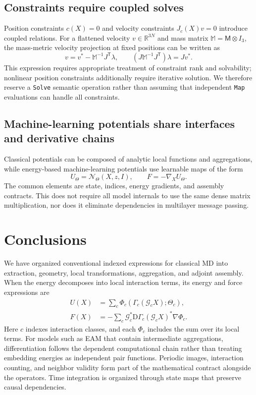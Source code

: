 \documentclass[11pt,a4paper]{article}
\newcommand{\RR}{\mathbb R}
\newcommand{\mass}{\mathsf M}
\theoremstyle{definition}
\begin{document}
\subsection{Constraints require coupled solves}
Position constraints $c(X)=0$ and velocity constraints $J_c(X)v=0$ introduce coupled relations.
For a flattened velocity $v\in\RR^{3N}$ and mass matrix $\mathbb M=\mass\otimes I_3$, the
mass-metric velocity projection at fixed positions can be written as
\begin{equation}
v=v^*-\mathbb M^{-1}J^{\mathsf T}\lambda,\qquad
(J\mathbb M^{-1}J^{\mathsf T})\lambda=Jv^*.
\end{equation}
This expression requires appropriate treatment of constraint rank and solvability; nonlinear
position constraints additionally require iterative solution. We therefore reserve a
\texttt{Solve} semantic operation rather than assuming that independent \texttt{Map} evaluations
can handle all constraints.

\subsection{Machine-learning potentials share interfaces and derivative chains}
Classical potentials can be composed of analytic local functions and aggregations, while
energy-based machine-learning potentials use learnable maps of the form
\begin{equation}
U_\Theta=\mathcal N_\Theta(X,z,I),\qquad F=-\nabla_XU_\Theta.
\end{equation}
The common elements are state, indices, energy gradients, and assembly contracts. This does not
require all model internals to use the same dense matrix multiplication, nor does it eliminate
dependencies in multilayer message passing.

\section{Conclusions}
We have organized conventional indexed expressions for classical MD into extraction, geometry,
local transformations, aggregation, and adjoint assembly. When the energy decomposes into local
interaction terms, its energy and force expressions are
\begin{align}
 U(X)&=\sum_c\Phi_c\!\left(\Gamma_c(\mathcal G_cX);\Theta_c\right),\label{eq:master-energy}\\
 F(X)&=-\sum_c\mathcal G_c^*\mathrm D\Gamma_c(\mathcal G_cX)^*\nabla\Phi_c.
 \label{eq:master-force}
\end{align}
Here $c$ indexes interaction classes, and each $\Phi_c$ includes the sum over its local terms.
For models such as EAM that contain intermediate aggregations, differentiation follows the
dependent computational chain rather than treating embedding energies as independent pair
functions. Periodic images, interaction counting, and neighbor validity form part of the
mathematical contract alongside the operators. Time integration is organized through state maps
that preserve causal dependencies.
\end{document}
